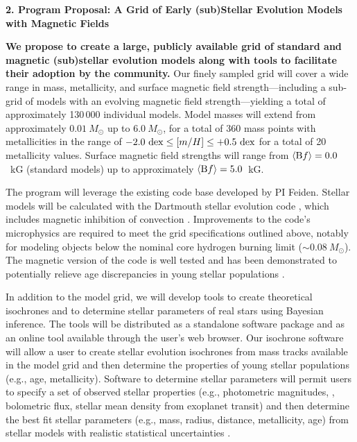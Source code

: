 %

{\bf\large 2. Program Proposal: A Grid of Early (sub)Stellar Evolution Models with Magnetic Fields}  

{\bf We propose to create a large, publicly available grid of standard and magnetic (sub)stellar evolution models along with tools to facilitate their adoption by the community.} Our finely sampled grid will cover a wide range in mass, metallicity, and surface magnetic field strength---including a sub-grid of models with an evolving magnetic field strength---yielding a total of approximately 130\,000 individual models. Model masses will extend from approximately $0.01\ M_{\odot}$ up to $6.0\ M_{\odot}$, for a total of 360 mass points with metallicities in the range of $-2.0\ {\rm dex}\le [m/H] \le +0.5\ {\rm dex}$ for a total of 20 metallicity values. Surface magnetic field strengths will range from $\langle {\rm B}f\rangle = 0.0$~kG (standard models) up to approximately $\langle {\rm B}f\rangle = 5.0$~kG. 


The program will leverage the existing code base developed by PI Feiden. Stellar models will be calculated with the Dartmouth stellar evolution code \citep{Chaboyer2001, Bjork2006, Dotter2008}, which includes magnetic inhibition of convection \citep{FC12b}. Improvements to the code's microphysics are required to meet the grid specifications outlined above, notably for modeling objects below the nominal core hydrogen burning limit ($\sim 0.08\ M_{\odot}$). The magnetic version of the code is well tested \citep{FC12b, FC13, FC14, FC14b} and has been demonstrated to potentially relieve age discrepancies in young stellar populations \citep{Feiden2016}. 

In addition to the model grid, we will develop tools to create theoretical isochrones and to determine stellar parameters of real stars using Bayesian inference. The tools will be distributed as a standalone software package and as an online tool available through the user's web browser. Our isochrone software will allow a user to create stellar evolution isochrones from mass tracks available in the model grid and then determine the properties of young stellar populations (e.g., age, metallicity). Software to determine stellar parameters will permit users to specify a set of observed stellar properties (e.g., photometric magnitudes, \teff, bolometric flux, stellar mean density from exoplanet transit) and then determine the best fit stellar parameters (e.g., mass, radius, distance, metallicity, age) from stellar models with realistic statistical uncertainties \citep[see, e.g.,][]{Mann2016}. 


